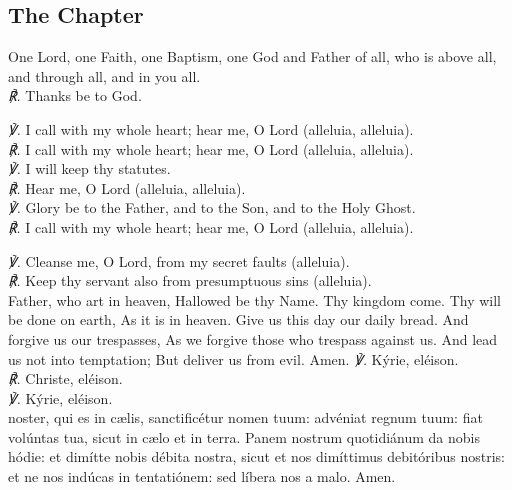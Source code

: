 \subsection{The Chapter}
One Lord, one Faith, one Baptism, one God and Father of all, who is above all, and through all, and in you all. \\
\textit{\scshape ℟.} Thanks be to God.\\
\par\noindent
\textit{\scshape ℣.} I call with my whole heart; hear me, O Lord (alleluia, alleluia).\\
\textit{\scshape ℟.} I call with my whole heart; hear me, O Lord (alleluia, alleluia).\\
\textit{\scshape ℣.} I will keep thy statutes.\\
\textit{\scshape ℟.} Hear me, O Lord (alleluia, alleluia).\\
\textit{\scshape ℣.} Glory be to the Father, and to the Son, and to the Holy Ghost.\\
\textit{\scshape ℟.} I call with my whole heart; hear me, O Lord (alleluia, alleluia).\\
\par\noindent
\textit{\scshape ℣.} Cleanse me, O Lord, from my secret faults (alleluia).\\
\textit{\scshape ℟.} Keep thy servant also from presumptuous sins (alleluia).
\\
 Father, who art in heaven, Hallowed be thy Name. Thy kingdom come. Thy will be done on earth, As it is in heaven. Give us this day our daily bread. And forgive us our trespasses, As we forgive those who trespass against us. And lead us not into temptation; But deliver us from evil. Amen.
{
\textit{\scshape ℣.} Kýrie, eléison.\\
\textit{\scshape ℟.} Christe, eléison.\\
\textit{\scshape ℣.} Kýrie, eléison.\\
 noster, qui es in c{\ae}lis, sanctificétur nomen tuum: advéniat regnum tuum: fiat volúntas tua, sicut in c{\ae}lo et in terra. Panem nostrum quotidiánum da nobis hódie: et dimítte nobis débita nostra, sicut et nos dimíttimus debitóribus nostris: et ne nos indúcas in tentatiónem: sed líbera nos a malo. Amen.}
